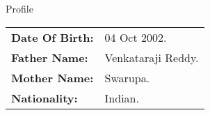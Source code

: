 \begin{rubric}{Profile}
\begin{tabular}{@{}ll}
\textbf{Date Of Birth:} & 04 Oct 2002. \\
\textbf{Father Name:} & Venkataraji Reddy. \\
\textbf{Mother Name:} & Swarupa. \\
\textbf{Nationality:} & Indian. \\
\end{tabular}
\end{rubric}

